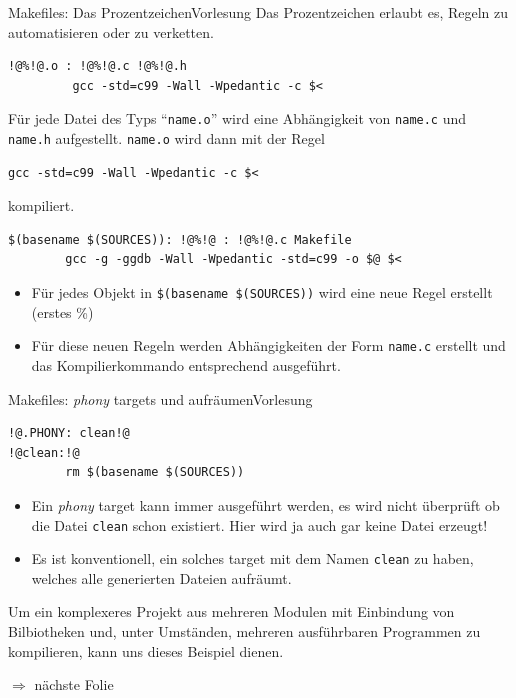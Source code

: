 \documentclass[xcolor=dvipsnames]{beamer}
\newcounter{lecturecounter}
\begin{document}
\begin{frame}[fragile]{Makefiles: Das Prozentzeichen}{Vorlesung }
Das Prozentzeichen erlaubt es, Regeln zu automatisieren oder zu verketten.
\begin{block}{}
\begin{lstlisting}[basicstyle=\ttfamily\scriptsize]
!@%!@.o : !@%!@.c !@%!@.h
         gcc -std=c99 -Wall -Wpedantic -c $<
\end{lstlisting}
Für jede Datei des Typs ``\verb|name.o|'' wird eine Abhängigkeit von \verb|name.c| und \verb|name.h| aufgestellt. \verb|name.o| wird dann mit der Regel
\begin{verbatim}
gcc -std=c99 -Wall -Wpedantic -c $<
\end{verbatim}
kompiliert.
\end{block}
\begin{block}{}
\begin{lstlisting}
$(basename $(SOURCES)): !@%!@ : !@%!@.c Makefile
        gcc -g -ggdb -Wall -Wpedantic -std=c99 -o $@ $<
\end{lstlisting}
\begin{itemize}
  \item{Für jedes Objekt in \verb|$(basename $(SOURCES))| wird eine neue Regel erstellt (erstes \%)}
  \item{Für diese neuen Regeln werden Abhängigkeiten der Form \verb|name.c| erstellt und das Kompilierkommando entsprechend ausgeführt.}
\end{itemize}
\end{block}
\end{frame}

\begin{frame}[fragile]{Makefiles: \emph{phony} targets und aufräumen}{Vorlesung }
\begin{lstlisting}[basicstyle=\ttfamily\scriptsize]
!@.PHONY: clean!@
!@clean:!@
        rm $(basename $(SOURCES))
\end{lstlisting}
\begin{block}{}
  \begin{itemize}
    \item{Ein \emph{phony} target kann immer ausgeführt werden, es wird nicht überprüft ob die Datei \texttt{clean} schon existiert. Hier wird ja auch gar keine Datei erzeugt!}
    \item{Es ist konventionell, ein solches target mit dem Namen \verb|clean| zu haben, welches alle generierten Dateien aufräumt.}
  \end{itemize}
\end{block}
\begin{block}{}
  Um ein komplexeres Projekt aus mehreren Modulen mit Einbindung von Bilbiotheken und, unter Umständen, mehreren ausführbaren Programmen zu kompilieren, kann uns dieses Beispiel dienen.
\end{block}
$\Rightarrow$ nächste Folie
\end{frame}
\end{document}
